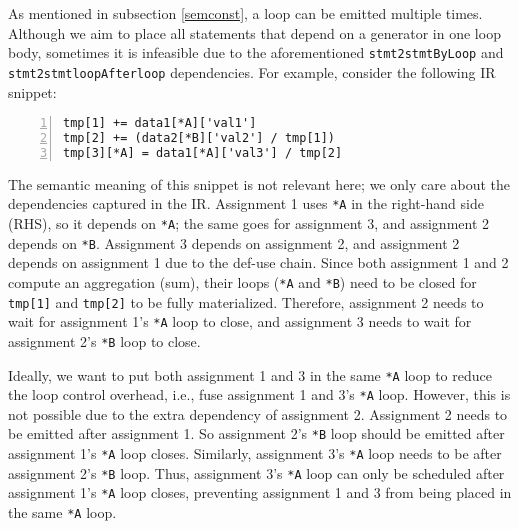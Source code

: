 \documentclass[sigplan, nonacm]{acmart}\settopmatter{printfolios=true,printccs=false,printacmref=false}
\begin{document}
As mentioned in subsection \ref{semconst}, a loop can be emitted multiple times. Although we aim to place all statements that depend on a generator in one loop body, sometimes it is infeasible due to the aforementioned \texttt{stmt2stmtByLoop} and \texttt{stmt2stmtloopAfterloop} dependencies. For example, consider the following IR snippet:
\begin{lstlisting}[numbers=left]
tmp[1] += data1[*A]['val1']
tmp[2] += (data2[*B]['val2'] / tmp[1])
tmp[3][*A] = data1[*A]['val3'] / tmp[2]
\end{lstlisting}
The semantic meaning of this snippet is not relevant here; we only care about the dependencies captured in the IR. Assignment 1 uses \texttt{*A} in the right-hand side (RHS), so it depends on \texttt{*A}; the same goes for assignment 3, and assignment 2 depends on \texttt{*B}. Assignment 3 depends on assignment 2, and assignment 2 depends on assignment 1 due to the def-use chain. Since both assignment 1 and 2 compute an aggregation (sum), their loops (\texttt{*A} and \texttt{*B}) need to be closed for \texttt{tmp[1]} and \texttt{tmp[2]} to be fully materialized. Therefore, assignment 2 needs to wait for assignment 1's \texttt{*A} loop to close, and assignment 3 needs to wait for assignment 2's \texttt{*B} loop to close.

Ideally, we want to put both assignment 1 and 3 in the same \texttt{*A} loop to reduce the loop control overhead, i.e., fuse assignment 1 and 3's \texttt{*A} loop. However, this is not possible due to the extra dependency of assignment 2. Assignment 2 needs to be emitted after assignment 1. So assignment 2's \texttt{*B} loop should be emitted after assignment 1's \texttt{*A} loop closes. Similarly, assignment 3's \texttt{*A} loop needs to be after assignment 2's \texttt{*B} loop. Thus, assignment 3's \texttt{*A} loop can only be scheduled after assignment 1's \texttt{*A} loop closes, preventing assignment 1 and 3 from being placed in the same \texttt{*A} loop.
\end{document}
